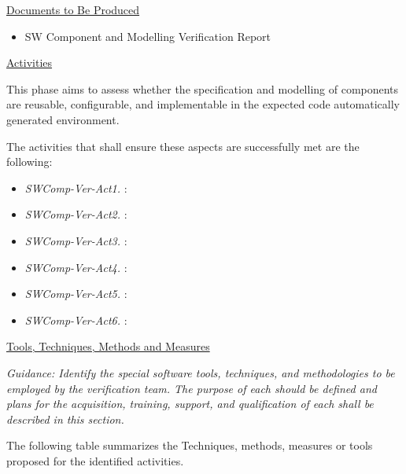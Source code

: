 \documentclass{template/openetcs_report}
\begin{document}
\underline{Documents to Be Produced} 

\begin{itemize}
\item SW Component and Modelling Verification Report
\end{itemize}

\underline{Activities}

This phase aims to assess whether the specification and modelling of components are reusable, configurable, and implementable in the expected code automatically generated environment. 

The activities that shall ensure these aspects are successfully met are the following:
\begin{itemize}
\item {\it SWComp-Ver-Act1.  }:  
\item {\it SWComp-Ver-Act2.  }:  
\item {\it SWComp-Ver-Act3.  }:  
\item {\it SWComp-Ver-Act4.  }:  
\item {\it SWComp-Ver-Act5.  }:  
\item {\it SWComp-Ver-Act6.  }:   
\end{itemize}

\underline{Tools, Techniques, Methods and Measures} 

\textit{Guidance: Identify the special software tools, techniques, and methodologies to be employed by the verification team. 
The purpose of each should be defined and plans for the acquisition, training, support, and qualification of each shall be described in this section.}

The following table summarizes the Techniques, methods, measures or tools proposed for the identified activities.
\end{document}
